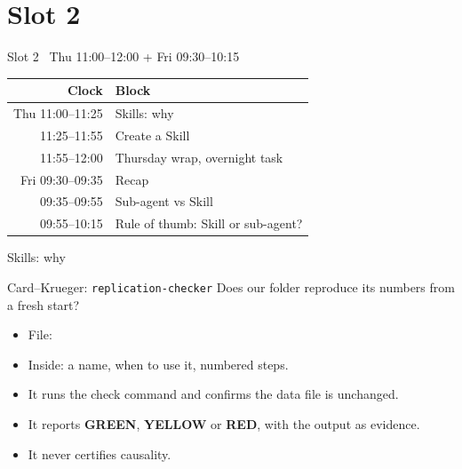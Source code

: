 
\section{Slot 2}

\begin{frame}{Slot 2 \textperiodcentered\ Thu 11:00--12:00 + Fri 09:30--10:15}
  \begin{center}
    \begin{tabular}{@{}rl@{}}
      \toprule
      \textbf{Clock} & \textbf{Block} \\
      \midrule
      Thu 11:00--11:25 & Skills: why \\
      11:25--11:55 & Create a Skill \\
      11:55--12:00 & Thursday wrap, overnight task \\
      \addlinespace[0.3em]
      Fri 09:30--09:35 & Recap \\
      09:35--09:55 & Sub-agent vs Skill \\
      09:55--10:15 & Rule of thumb: Skill or sub-agent? \\
      \bottomrule
    \end{tabular}
  \end{center}
\end{frame}

\begin{frame}{Skills: why}
\end{frame}

\begin{frame}{Card--Krueger: \texttt{replication-checker}}
  Does our folder reproduce its numbers from a fresh start?
  \vspace{0.4em}
  \begin{itemize}
    \item File: 
    \item Inside: a name, when to use it, numbered steps.
    \item It runs the check command and confirms the data file is unchanged.
    \item It reports \textcolor{codegreen}{\textbf{GREEN}}, \textbf{YELLOW} or \textcolor{codered}{\textbf{RED}}, with the output as evidence.
    \item It never certifies causality.
  \end{itemize}
\end{frame}


